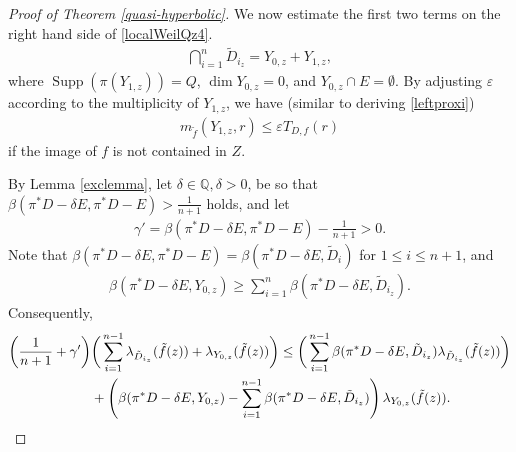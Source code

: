 \documentclass[10pt]{amsart}
\numberwithin{equation}{section}
\theoremstyle{plain}
\theoremstyle{definition}
\DeclareMathOperator{\Supp}{Supp}
\begin{document}
\begin{proof}[Proof of Theorem \ref{quasi-hyperbolic}]
We now estimate the first two terms on the right hand side of \eqref{localWeilQz4}.
\begin{align*}
\bigcap_{i=1}^n\tilde D_{i_z}=Y_{0,z}+Y_{1,z},
\end{align*}
where $\Supp (\pi(Y_{1,z}))=Q$, $\dim Y_{0,z}=0$, and $Y_{0,z}\cap E=\emptyset$. By adjusting $\varepsilon$ according to the multiplicity of $Y_{1,z}$, we have (similar  to deriving \eqref{leftproxi})
\begin{align}\label{proxiY1}
m_{\tilde f}({Y_{1,z}},r)\le \varepsilon T_{D,f}(r)
\end{align}
if the image of $f$ is not contained in $Z$.  

By Lemma \ref{exclemma}, let $\delta\in\mathbb{Q}, \delta>0$, be so that $\beta(\pi^*D-\delta E,\pi^*D-E)>\frac{1}{n+1}$ holds, and let 
\begin{align*}
\gamma'=\beta(\pi^*D-\delta E, \pi^*D-E)-\frac{1}{n+1}>0.
\end{align*}
Note that $\beta(\pi^*D-\delta E, \pi^*D-E)=\beta(\pi^*D-\delta E, \tilde D_{i})$ for $1\le i\le n+1$, and
\begin{align*}
\beta(\pi^*D-\delta E, Y_{0,z})\geq \sum_{i=1}^{n}\beta(\pi^*D-\delta E, \tilde D_{i_z}). 
\end{align*}
Consequently,
\begin{align}\label{localWeilQz5} 
 \left(\frac{1}{n+1}+\gamma'\right) &\bigg(\sum_{i=1}^{n-1}\lambda_{\tilde D_{i_z}}(\tilde f(z)) +\lambda_{Y_{0,z}}(\tilde f(z))\bigg)   
\le \bigg(\sum_{i=1}^{n-1}\beta(\pi^*D-\delta E, \tilde D_{i_z})\lambda_{\tilde D_{i_z}}(\tilde f(z)) \bigg)\notag\\
&+\left(\beta(\pi^*D-\delta E, Y_{0,z})-\sum_{i=1}^{n-1}\beta(\pi^*D-\delta E, \tilde D_{i_z})\right)\lambda_{Y_{0,z}}(\tilde f(z)). 
\end{align}


\end{proof}
\end{document}
